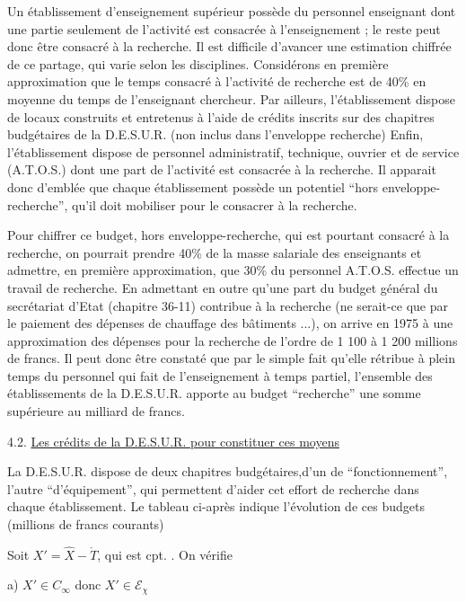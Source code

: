 Un établissement d'enseignement supérieur possède du personnel enseignant dont une partie seulement de l'activité est consacrée à l'enseignement ; le reste peut donc être consacré à la recherche. Il est difficile d'avancer une estimation chiffrée de ce partage, qui varie selon les disciplines. Considérons en première approximation que le temps consacré à l'activité de recherche est de 40\% en moyenne du temps de l'enseignant chercheur. Par ailleurs, l'établissement dispose de locaux construits et entretenus à l'aide de crédits inscrits sur des chapitres budgétaires de la D.E.S.U.R. (non inclus dans l'enveloppe recherche) Enfin, l'établissement dispose de personnel administratif, technique, ouvrier et de service (A.T.O.S.) dont une part de l'activité est consacrée à la recherche. Il apparait donc d'emblée que chaque établissement possède un potentiel ``hors enveloppe-recherche'', qu'il doit mobiliser pour le consacrer à la recherche.

Pour chiffrer ce budget, hors enveloppe-recherche, qui est pourtant consacré à la recherche, on pourrait prendre 40\% de la masse salariale des enseignants et admettre, en première approximation, que 30\% du personnel A.T.O.S. effectue un travail de recherche. En admettant en outre qu'une part du budget général du secrétariat d'Etat (chapitre 36-11) contribue à la recherche (ne serait-ce que par le paiement des dépenses de chauffage des bâtiments ...), on arrive en 1975 à une approximation des dépenses pour la recherche de l'ordre de 1 100 à 1 200 millions de francs. Il peut donc être constaté que par le simple fait qu'elle rétribue à plein temps du personnel qui fait de l'enseignement à temps partiel, l'ensemble des établissements de la D.E.S.U.R. apporte au budget ``recherche'' une somme supérieure au milliard de francs.

4.2. \uline{Les crédits de la D.E.S.U.R. pour constituer ces moyens}

La D.E.S.U.R. dispose de deux chapitres budgétaires,d'un de ``fonctionnement'', l'autre ``d'équipement'', qui permettent d'aider cet effort de recherche dans chaque établissement. Le tableau ci-après indique l'évolution de ces budgets (millions de francs courants)


Soit $X'=\widehat X-\mathring T$, qui est cpt. . On vérifie


a) $X'\in C_\infty$ donc $X'\in\mathcal E_\chi$

